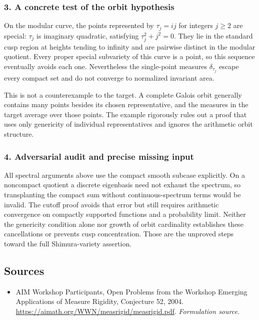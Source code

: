\documentclass[11pt]{article}
\begin{document}
\subsubsection{3. A concrete test of the orbit hypothesis}
On the modular curve, the points represented by $\tau_j=ij$ for integers $j\ge2$ are special: $\tau_j$ is imaginary quadratic, satisfying $\tau_j^2+j^2=0$. They lie in the standard cusp region at heights tending to infinity and are pairwise distinct in the modular quotient. Every proper special subvariety of this curve is a point, so this sequence eventually avoids each one. Nevertheless the single-point measures $\delta_{\tau_j}$ escape every compact set and do not converge to normalized invariant area.

This is not a counterexample to the target. A complete Galois orbit generally contains many points besides its chosen representative, and the measures in the target average over those points. The example rigorously rules out a proof that uses only genericity of individual representatives and ignores the arithmetic orbit structure.

\subsubsection{4. Adversarial audit and precise missing input}
All spectral arguments above use the compact smooth subcase explicitly. On a noncompact quotient a discrete eigenbasis need not exhaust the spectrum, so transplanting the compact sum without continuous-spectrum terms would be invalid. The cutoff proof avoids that error but still requires arithmetic convergence on compactly supported functions and a probability limit. Neither the genericity condition alone nor growth of orbit cardinality establishes these cancellations or prevents cusp concentration. Those are the unproved steps toward the full Shimura-variety assertion.

\subsection{Sources}
\begin{itemize}
\item[S1]AIM Workshop Participants, Open Problems from the Workshop Emerging Applications of Measure Rigidity, Conjecture 52, 2004.
\url{https://aimath.org/WWN/measrigid/measrigid.pdf}.
\textit{Formulation source.}
\end{itemize}
\end{document}
